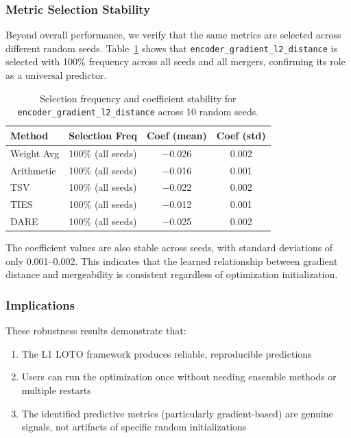 \subsubsection{Metric Selection Stability}

Beyond overall performance, we verify that the same metrics are selected across different random seeds. Table~\ref{tab:metric_stability} shows that \texttt{encoder\_gradient\_l2\_distance} is selected with 100\% frequency across all seeds and all mergers, confirming its role as a universal predictor.

\begin{table}[h]
\centering
\caption{Selection frequency and coefficient stability for \texttt{encoder\_gradient\_l2\_distance} across 10 random seeds.}
\label{tab:metric_stability}
\begin{tabular}{@{}lccc@{}}
\toprule
\textbf{Method} & \textbf{Selection Freq} & \textbf{Coef (mean)} & \textbf{Coef (std)} \\
\midrule
Weight Avg & 100\% (all seeds) & $-$0.026 & 0.002 \\
Arithmetic & 100\% (all seeds) & $-$0.016 & 0.001 \\
TSV & 100\% (all seeds) & $-$0.022 & 0.002 \\
TIES & 100\% (all seeds) & $-$0.012 & 0.001 \\
DARE & 100\% (all seeds) & $-$0.025 & 0.002 \\
\bottomrule
\end{tabular}
\end{table}

The coefficient values are also stable across seeds, with standard deviations of only 0.001--0.002. This indicates that the learned relationship between gradient distance and mergeability is consistent regardless of optimization initialization.

\subsubsection{Implications}

These robustness results demonstrate that:
\begin{enumerate}
    \item The L1 LOTO framework produces reliable, reproducible predictions
    \item Users can run the optimization once without needing ensemble methods or multiple restarts
    \item The identified predictive metrics (particularly gradient-based) are genuine signals, not artifacts of specific random initializations
\end{enumerate}
